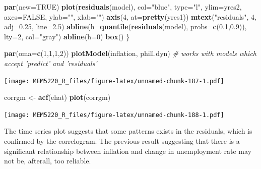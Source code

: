 \documentclass[]{book}
\newenvironment{Shaded}{\begin{snugshade}}{\end{snugshade}}
\newcommand{\CommentTok}[1]{\textcolor[rgb]{0.56,0.35,0.01}{\textit{#1}}}
\newcommand{\DataTypeTok}[1]{\textcolor[rgb]{0.13,0.29,0.53}{#1}}
\newcommand{\DecValTok}[1]{\textcolor[rgb]{0.00,0.00,0.81}{#1}}
\newcommand{\FloatTok}[1]{\textcolor[rgb]{0.00,0.00,0.81}{#1}}
\newcommand{\KeywordTok}[1]{\textcolor[rgb]{0.13,0.29,0.53}{\textbf{#1}}}
\newcommand{\NormalTok}[1]{#1}
\newcommand{\OtherTok}[1]{\textcolor[rgb]{0.56,0.35,0.01}{#1}}
\newcommand{\StringTok}[1]{\textcolor[rgb]{0.31,0.60,0.02}{#1}}
\begin{document}
\begin{Shaded}
\begin{Highlighting}[]
  \KeywordTok{par}\NormalTok{(}\DataTypeTok{new=}\OtherTok{TRUE}\NormalTok{)}
  \KeywordTok{plot}\NormalTok{(}\KeywordTok{residuals}\NormalTok{(model), }\DataTypeTok{col=}\StringTok{"blue"}\NormalTok{, }\DataTypeTok{type=}\StringTok{"l"}\NormalTok{, }\DataTypeTok{ylim=}\NormalTok{yres2, }\DataTypeTok{axes=}\OtherTok{FALSE}\NormalTok{, }
       \DataTypeTok{ylab=}\StringTok{""}\NormalTok{, }\DataTypeTok{xlab=}\StringTok{""}\NormalTok{)}
  \KeywordTok{axis}\NormalTok{(}\DecValTok{4}\NormalTok{, }\DataTypeTok{at=}\KeywordTok{pretty}\NormalTok{(yres1))}
  \KeywordTok{mtext}\NormalTok{(}\StringTok{"residuals"}\NormalTok{, }\DecValTok{4}\NormalTok{, }\DataTypeTok{adj=}\FloatTok{0.25}\NormalTok{, }\DataTypeTok{line=}\FloatTok{2.5}\NormalTok{)}
  \KeywordTok{abline}\NormalTok{(}\DataTypeTok{h=}\KeywordTok{quantile}\NormalTok{(}\KeywordTok{residuals}\NormalTok{(model), }\DataTypeTok{probs=}\KeywordTok{c}\NormalTok{(}\FloatTok{0.1}\NormalTok{,}\FloatTok{0.9}\NormalTok{)), }\DataTypeTok{lty=}\DecValTok{2}\NormalTok{, }\DataTypeTok{col=}\StringTok{"gray"}\NormalTok{)}
  \KeywordTok{abline}\NormalTok{(}\DataTypeTok{h=}\DecValTok{0}\NormalTok{)}
  \KeywordTok{box}\NormalTok{()  }
\NormalTok{\}  }
\end{Highlighting}
\end{Shaded}

\begin{Shaded}
\begin{Highlighting}[]
\KeywordTok{par}\NormalTok{(}\DataTypeTok{oma=}\KeywordTok{c}\NormalTok{(}\DecValTok{1}\NormalTok{,}\DecValTok{1}\NormalTok{,}\DecValTok{1}\NormalTok{,}\DecValTok{2}\NormalTok{))}
\KeywordTok{plotModel}\NormalTok{(inflation, phill.dyn) }\CommentTok{# works with models which accept 'predict' and 'residuals'}
\end{Highlighting}
\end{Shaded}

\texttt{[image: MEM5220\_R\_files/figure-latex/unnamed-chunk-187-1.pdf]}

\begin{Shaded}
\begin{Highlighting}[]
\NormalTok{corrgm <-}\StringTok{ }\KeywordTok{acf}\NormalTok{(ehat)}
\KeywordTok{plot}\NormalTok{(corrgm)}
\end{Highlighting}
\end{Shaded}

\texttt{[image: MEM5220\_R\_files/figure-latex/unnamed-chunk-188-1.pdf]}

The time series plot suggests that some patterns exists in the residuals, which is confirmed by the correlogram. The previous result suggesting that there is a significant relationship between inflation and change in unemployment rate may not be, afterall, too reliable.
\end{document}
